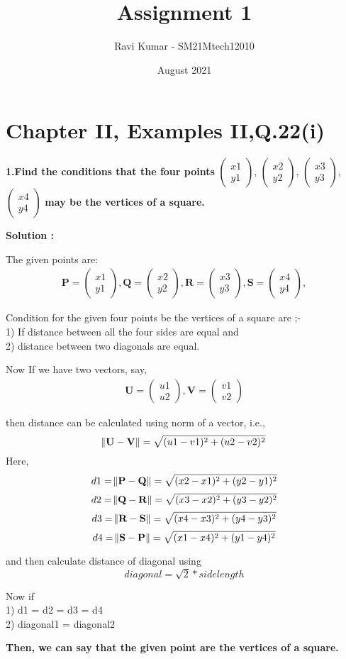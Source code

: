 \documentclass{article}
\title{\textbf{\Huge Assignment 1}}
\author{\large Ravi Kumar - SM21Mtech12010}
\date{August 2021}
\begin{document}
\providecommand{\mbf}{\mathbf}


\newcommand{\myvec}[1]{\ensuremath{\begin{pmatrix}#1\end{pmatrix}}}
\let\vec\mathbf


\maketitle

\section*{Chapter II, Examples II,Q.22(i)}

\textbf{1.Find the conditions that the four points}
\myvec{x1\\y1}, \myvec{x2\\y2},
\myvec{x3\\y3}, \myvec{x4\\y4}
\textbf{ may be the vertices of a square.}


\textbf{Solution : }
\vspace{0.2cm}

The given points are:
\begin{align*}
\vec{P} = \myvec{x1\\y1}, \vec{Q} =\myvec{x2\\y2},
\vec{R} =\myvec{x3\\y3}, \vec{S} =\myvec{x4\\y4},
\end{align*}


Condition for the given four points be the vertices of a square are ;-\\
1) If distance between all the four sides are equal and\\
2) distance between two diagonals are equal.

\vspace{0.2cm}

Now If we have two vectors, say,
\begin{align*}
\vec{U} = \myvec{u1\\u2}, \vec{V} =\myvec{v1\\v2}
\end{align*} 


then distance can be calculated using norm of a vector, i.e., 
$$\norm{ \vec{U} - \vec{V}} = \sqrt{(u1-v1)^2+(u2-v2)^2}$$
Here, $$ d1=\norm{ \vec{P} - \vec{Q}} =\sqrt{(x2-x1)^2+(y2-y1)^2}$$
$$ d2=\norm{ \vec{Q} - \vec{R}} =\sqrt{(x3-x2)^2+(y3-y2)^2}$$
$$ d3=\norm{ \vec{R} - \vec{S}} =\sqrt{(x4-x3)^2+(y4-y3)^2}$$
$$ d4=\norm{ \vec{S} - \vec{P}} =\sqrt{(x1-x4)^2+(y1-y4)^2}$$

\vspace{0.2cm}
and then calculate distance of diagonal using 
$$diagonal = \sqrt{2}* side length$$




Now if \\ 1) d1 = d2 = d3 = d4\\ 
2) diagonal1 = diagonal2 


\textbf{Then, we can say that the given point are the vertices of a square.}
\end{document}
